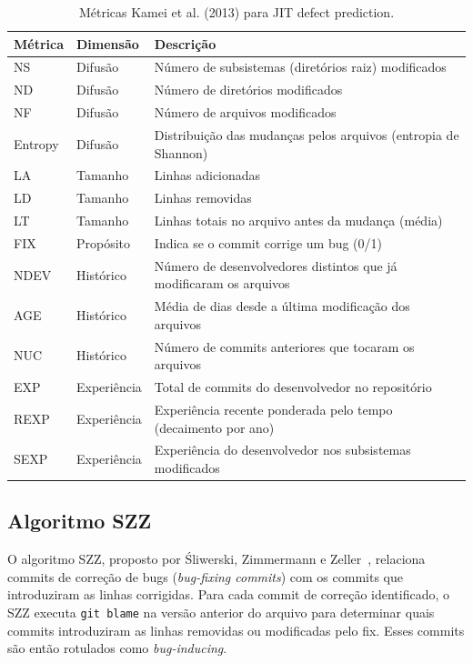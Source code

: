 \documentclass[12pt]{article}
\begin{document}
\begin{table}[H]
\centering
\caption{Métricas Kamei et al. (2013) para JIT defect prediction.}
\label{tab:kamei}
\small
\begin{tabular}{llp{7cm}}
\toprule
\textbf{Métrica} & \textbf{Dimensão} & \textbf{Descrição} \\
\midrule
NS      & Difusão    & Número de subsistemas (diretórios raiz) modificados \\
ND      & Difusão    & Número de diretórios modificados \\
NF      & Difusão    & Número de arquivos modificados \\
Entropy & Difusão    & Distribuição das mudanças pelos arquivos (entropia de Shannon) \\
LA      & Tamanho    & Linhas adicionadas \\
LD      & Tamanho    & Linhas removidas \\
LT      & Tamanho    & Linhas totais no arquivo antes da mudança (média) \\
FIX     & Propósito  & Indica se o commit corrige um bug (0/1) \\
NDEV    & Histórico  & Número de desenvolvedores distintos que já modificaram os arquivos \\
AGE     & Histórico  & Média de dias desde a última modificação dos arquivos \\
NUC     & Histórico  & Número de commits anteriores que tocaram os arquivos \\
EXP     & Experiência & Total de commits do desenvolvedor no repositório \\
REXP    & Experiência & Experiência recente ponderada pelo tempo (decaimento por ano) \\
SEXP    & Experiência & Experiência do desenvolvedor nos subsistemas modificados \\
\bottomrule
\end{tabular}
\end{table}

\subsection{Algoritmo SZZ}

O algoritmo SZZ, proposto por Śliwerski, Zimmermann e Zeller~\cite{szz2005},
relaciona commits de correção de bugs (\textit{bug-fixing commits}) com os commits
que introduziram as linhas corrigidas. Para cada commit de correção identificado,
o SZZ executa \texttt{git blame} na versão anterior do arquivo para determinar quais
commits introduziram as linhas removidas ou modificadas pelo fix. Esses commits são
então rotulados como \textit{bug-inducing}.
\end{document}

